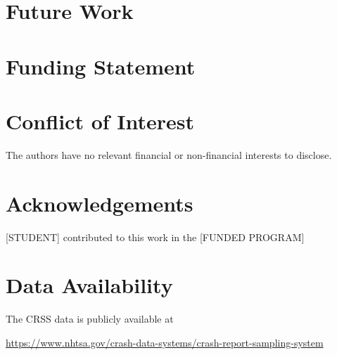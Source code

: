 \documentclass[fleqn]{cas-sc}
\begin{document}
\section{Future Work}

\section*{Funding Statement}

\section*{Conflict of Interest}

The authors have no relevant financial or non-financial interests to disclose.

\section*{Acknowledgements}

[STUDENT]
contributed to this work in the 
[FUNDED PROGRAM]

\section*{Data Availability}

The CRSS data is publicly available at 

\url{https://www.nhtsa.gov/crash-data-systems/crash-report-sampling-system}


\begin{comment}
\begin{figure}[<options>]
	\centering
		\texttt{[image: ]}
	  \caption{}\label{fig1}
\end{figure}


\begin{table}[<options>]
\caption{}\label{tbl1}
\begin{tabular*}{\tblwidth}{@{}LL@{}}
\toprule
  &  \\ %
\midrule
 & \\
 & \\
 & \\
 & \\
\bottomrule
\end{tabular*}
\end{table}
\end{comment}
\end{document}
